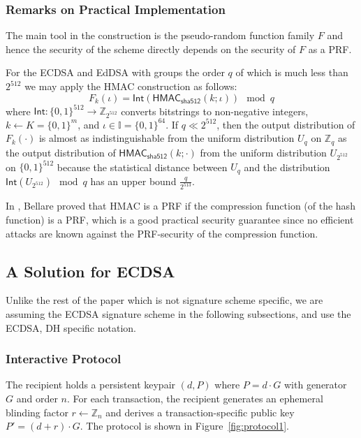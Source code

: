 \documentclass{article}
\begin{document}
\subsubsection{Remarks on Practical Implementation}

The main tool in the construction is the pseudo-random function family $F$ and hence the security of the scheme directly depends on the security of $F$ as a PRF.

For the ECDSA and EdDSA with groups the order $q$ of which is much less than $2^{512}$ we may apply the HMAC construction \cite{BeCK96} as follows:
\[
F_k(\iota) = \mathsf{Int}(\mathsf{HMAC}_{\mathsf{sha512}} (k;\iota)) \mod q
\]
where $\mathsf{Int}\colon \{0,1\}^{512}\rightarrow \mathbb{Z}_{2^{512}}$ converts bitstrings to non-negative integers, $k\gets K=\{0,1\}^{m}$, and $\iota\in\mathbb{I}=\{0,1\}^{64}$.
If
$q\ll 2^{512}$, then the output distribution
of $F_k(\cdot)$ is almost as indistinguishable
from the uniform distribution $U_q$ on $\mathbb{Z}_{q}$ as the output distribution of $\mathsf{HMAC}_{\mathsf{sha512}} (k;\cdot)$ from the uniform distribution $U_{2^{512}}$ on $\{0,1\}^{512}$
because the statistical distance between
$U_q$ and the distribution  $\mathsf{Int}(U_{2^{512}})\!\!\mod q$ has an upper bound $\frac{q}{2^{513}}$.

In \cite{Bell15}, Bellare proved that HMAC is a PRF if the compression function (of the hash function) is a PRF, which is a good practical security guarantee since no efficient attacks are known against the PRF-security of the compression function.

\subsection{A Solution for ECDSA}

Unlike the rest of the paper which is not signature scheme specific, we are assuming the ECDSA signature scheme\cite{ecdsa} in the following subsections, and use the ECDSA, DH specific notation.

\subsubsection{Interactive Protocol}

The recipient holds a persistent keypair $(d, P)$ where $P = d \cdot G$ with generator $G$ and order $n$. For each transaction, the recipient generates an ephemeral blinding factor $r \gets \mathbb{Z}_n$ and derives a transaction-specific public key $P' = (d + r) \cdot G$. The protocol is shown in Figure~\ref{fig:protocol1}.
\end{document}
